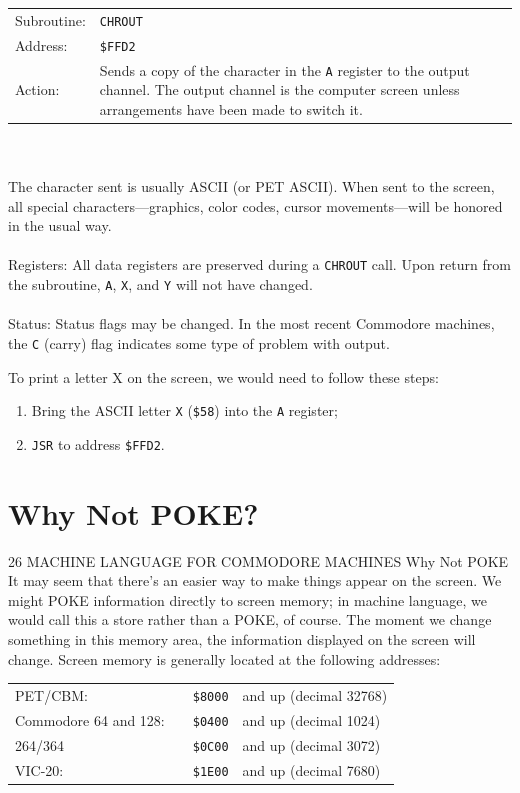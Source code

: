 \documentclass[11pt,a4paper,titlepage]{memoir}
\begin{document}
\begin{framed}
	\begin{tabulary}{0.9\textwidth}{lL}
		Subroutine: & \texttt{CHROUT} \\
		Address: & \texttt{\$FFD2} \\
		Action: & Sends a copy of the character in the \texttt{A} register to the
		output channel. The output channel is the computer screen
		unless arrangements have been made to switch it.\\
	\end{tabulary}\\\\
	The character sent is usually ASCII (or PET ASCII). When sent to the
	screen, all special characters—graphics, color codes, cursor movements—will be honored in the usual way.\\\\
	Registers: All data registers are preserved during a \texttt{CHROUT} call.
	Upon return from the subroutine, \texttt{A}, \texttt{X}, and \texttt{Y} will not have changed.\\\\
	Status: Status flags may be changed. In the most recent Commodore
	machines, the \texttt{C} (carry) flag indicates some type of problem with output.
\end{framed}
\noindent 
To print a letter X on the screen, we would need to follow these steps:
\begin{enumerate}
	\item Bring the ASCII letter \texttt{X} (\texttt{\$58}) into the \texttt{A} register;
	\item \texttt{JSR} to address \texttt{\$FFD2}.
\end{enumerate}

\section{Why Not POKE?}
26 MACHINE LANGUAGE FOR COMMODORE MACHINES
Why Not POKE
It may seem that there's an easier way to make things appear on the
screen. We might POKE information directly to screen memory; in machine language, we would call this a store rather than a POKE, of course.
The moment we change something in this memory area, the information
displayed on the screen will change. Screen memory is generally located
at the following addresses:


\begin{tabular}{llll}
PET/CBM:              && \texttt{\$8000} & and up (decimal 32768)\\
Commodore 64 and 128: && \texttt{\$0400} & and up (decimal 1024)\\
264/364               && \texttt{\$0C00} & and up (decimal 3072)\\
VIC-20:               && \texttt{\$1E00} & and up (decimal 7680)\\
\end{tabular}\\
\end{document}
